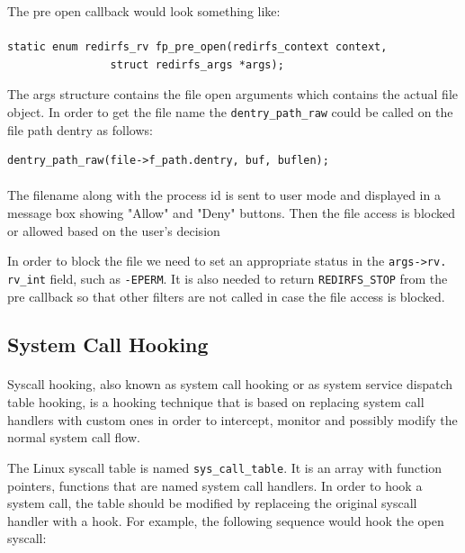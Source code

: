	The pre open callback would look something like:
	\paragraph{}
	\begin{Verbatim}[fontsize=\small, commandchars=\\\{\}]
static enum redirfs_rv fp_pre_open(redirfs_context context,
				struct redirfs_args *args);
	\end{Verbatim}
	
	The args structure contains the file open arguments which contains the actual file object. In order to get the file name the \texttt{dentry\_path\_raw} could be called on the file path dentry as follows:
	\begin{Verbatim}[fontsize=\small, commandchars=\\\{\}]
	dentry_path_raw(file->f_path.dentry, buf, buflen);
	\end{Verbatim}
	
	\paragraph{}
	The filename along with the process id is sent to user mode and displayed in a message box showing "Allow" and "Deny" buttons. Then the file access is blocked or allowed based on the user's decision
	
	In order to block the file we need to set an appropriate status in the \texttt{args->rv. rv\_int} field, such as \texttt{-EPERM}. It is also needed to return \texttt{REDIRFS\_STOP} from the pre callback so that other filters are not called in case the file access is blocked.
	
	\subsection{System Call Hooking}
	\paragraph{} 
	Syscall hooking, also known as system call hooking or as system service dispatch table hooking, is a hooking technique that is based on replacing system call handlers with custom ones in order to intercept, monitor and possibly modify the normal system call flow.
	
	The Linux syscall table is named \texttt{sys\_call\_table}. It is an array with function pointers, functions that are named system call handlers. In order to hook a system call, the table should be modified by replaceing the original syscall handler with a hook. For example, the following sequence would hook the open syscall:
	
